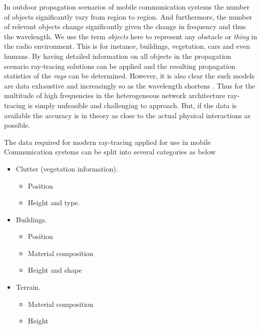 In outdoor propagation scenarios of mobile communication systems the number of objects significantly vary from region to region. And furthermore, the number of relevant objects change significantly given the change in frequency and thus the wavelength. We use the term \emph{objects} here to represent any obstacle or \emph{thing} in the radio environment. This is for instance, buildings, vegetation, cars and even humans. By having detailed information on all objects in the propagation scenario ray-tracing solutions can be applied and the resulting propagation statistics of the \emph{rays} can be determined. However, it is also clear the such models are data exhaustive and increasingly so as the wavelength shortens \cite{Tse2005FundamentalsCommunication}. Thus for the multitude of high frequencies in the heterogeneous network architecture ray-tracing is simply unfeasible and challenging to approach. But, if the data is available the accuracy is in theory as close to the actual physical interactions as possible.

The data required for modern ray-tracing applied for use in mobile Communication systems can be split into several categories as below
\begin{itemize}
    \item Clutter (vegetation information).
    \begin{itemize}
        \item Position
        \item Height and type.
    \end{itemize}
    \item Buildings.
    \begin{itemize}
        \item Position
        \item Material composition
        \item Height and shape
    \end{itemize}
    \item Terrain. 
    \begin{itemize}
        \item Material composition
        \item Height
    \end{itemize}
\end{itemize}

